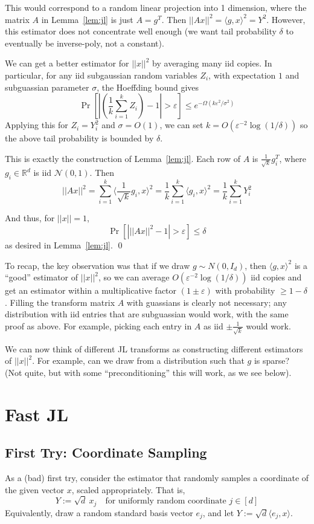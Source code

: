 \documentclass[]{article}
\newcommand{\1}{\mathbbm{1}}
\newcommand{\R}{\mathbb{R}}
\newcommand{\N}{\mathcal{N}}
\renewcommand{\epsilon}{\varepsilon}
\newcommand{\innp}[1]{\langle #1 \rangle}
\begin{document}
This would correspond to a random linear projection into 1 dimension, where the
matrix $A$ in Lemma~\ref{lem:jl} is just $A = g^T$. Then
$||Ax||^2 = \innp{g, x}^2 = Y^2$. However, this estimator does
not concentrate well enough (we want tail probability $\delta$ to eventually be
inverse-poly, not a constant).

We can get a better estimator for $||x||^2$ by averaging many iid copies.
In particular, for any iid subgaussian random variables $Z_i$, with expectation
$1$ and subguassian parameter $\sigma$, the Hoeffding bound gives
$$\Pr\left[ \left|\left(\frac{1}{k}\sum_{i=1}^k Z_i \right) - 1 \right| > \epsilon \right]
\leq e^{-\Omega(k\epsilon^2/\sigma^2)}$$
Applying this for $Z_i = Y_i^2$ and $\sigma = O(1)$,
we can set $k = O(\epsilon^{-2}\log(1/\delta))$
so the above tail probability is bounded by $\delta$.

This is exactly the construction of Lemma~\ref{lem:jl}.
Each row of $A$ is $\frac{1}{\sqrt{k}} g_i^T$, where $g_i \in \R^d$ is iid $\N(0, 1)$.
Then
$$||A x||^2
= \sum_{i=1}^k \innp{\frac{1}{\sqrt{k}} g_i, x}^2
= \frac{1}{k} \sum_{i=1}^k \innp{g_i, x}^2
= \frac{1}{k} \sum_{i=1}^k Y_i^2$$

And thus, for $||x||=1$,
$$\Pr\left[ \left| ||A x||^2 - 1 \right| > \epsilon\right] \leq \delta$$
as desired in Lemma~\ref{lem:jl}. \qed

To recap, the key observation was that if we draw $g \sim N(0, I_d)$, then $\innp{g, x}^2$
is a ``good'' estimator of $||x||^2$, so we can average
$O(\epsilon^{-2}\log(1/\delta))$ iid copies and get an estimator within a
multiplicative factor $(1 \pm \epsilon)$ with probability $\geq 1-\delta$.
Filling the transform matrix $A$ with guassians is clearly not necessary;
any distribution with iid entries that are subguassian would work, with the same
proof as above.
For example, picking each entry in $A$ as iid $\pm \frac{1}{\sqrt k}$ would work.

We can now think of different JL transforms as constructing different estimators
of $||x||^2$.
For example, can we draw from a distribution such that $g$ is sparse?
(Not quite, but with some ``preconditioning'' this will work, as we see below).

\section{Fast JL}

\subsection{First Try: Coordinate Sampling}
As a (bad) first try, consider the estimator that randomly samples a coordinate
of the given vector $x$, scaled appropriately. That is,
$$Y := \sqrt{d} ~x_j \quad\text{for uniformly random coordinate $j \in [d]$}$$
Equivalently, draw a random standard basis vector $e_j$, and let
$Y := \sqrt{d} \innp{e_j, x}$.
\end{document}
